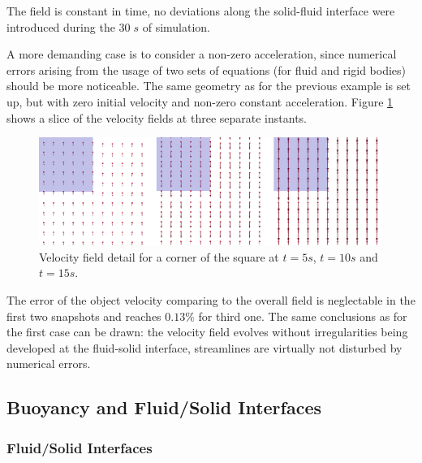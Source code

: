 The field is constant in time, no deviations along the solid-fluid interface were introduced during the $30\;s$ of simulation. 

A more demanding case is to consider a non-zero acceleration, since numerical errors arising from the usage of two sets of equations (for fluid and rigid bodies) should be more noticeable. The same geometry as for the previous example is set up, but with zero initial velocity and non-zero constant acceleration. Figure \ref{fig:Free_stream_C2} shows a slice of the velocity fields at three separate instants.
%
\begin{figure}[ht!]
	\centering
	\includegraphics[width=0.9\linewidth]{Figures/5.Chapter/fig2_I}
	\caption{Velocity field detail for a corner of the square at $t=5s$, $t=10s$ and $t=15s$.}
	\label{fig:Free_stream_C2} 
\end{figure}
%

The error of the object velocity comparing to the overall field is neglectable in the first two snapshots and reaches $0.13\%$ for third one. The same conclusions as for the first case can be drawn: the velocity field evolves without irregularities being developed at the fluid-solid interface, streamlines are virtually not disturbed by numerical errors.


\subsection{Buoyancy and Fluid/Solid Interfaces}
\label{sec:validation_buoyancy}

\subsubsection{Fluid/Solid Interfaces}
\label{sec:Fluid/Solid Interfaces}

